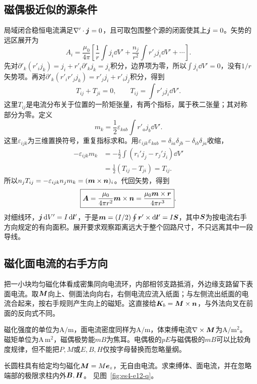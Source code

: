 \subsection{磁偶极近似的源条件}
局域闭合稳恒电流满足$\nabla'\cdot\bm{j}=0$，且可取包围整个源的闭面使其上$\bm{j}=0$。矢势的远区展开为
\[A_i=\frac{\mu_0}{4\pi}\left[\frac1r\int j_i\dd V'
+\frac{n_j}{r^2}\int r'_jj_i\dd V'+\cdots\right].
\]
先对$\partial'_k(r'_ij_k)=j_i+r'_i\partial'_kj_k=j_i$积分，边界项为零，所以$\int j_i\dd V'=0$，没有$1/r$矢势项。再对$\partial'_k(r'_ir'_jj_k)=r'_jj_i+r'_ij_j$积分，得到
\[T_{ij}+T_{ji}=0,\qquad T_{ij}=\int r'_jj_i\dd V'.\]
这里$T_{ij}$是电流分布关于位置的一阶矩张量，有两个指标，属于秩二张量；其对称部分为零。定义
\[m_k=\frac12\varepsilon_{kab}\int r'_aj_b\dd V'.\]
这里$\varepsilon_{ijk}$为三维置换符号，重复指标求和。用$\varepsilon_{ijk}\varepsilon_{kab}=\delta_{ia}\delta_{jb}-\delta_{ib}\delta_{ja}$收缩，
\[\begin{aligned}
-\varepsilon_{ijk}m_k
&=-\frac12\int(r_i'j_j-r_j'j_i)\dd V'\\
&=\frac12(T_{ij}-T_{ji})=T_{ij}.
\end{aligned}\]
所以$n_jT_{ij}=-\varepsilon_{ijk}n_jm_k=(\bm{m}\times\bm{n})_i$。代回矢势，得到
\[\boxed{\bm{A}=\frac{\mu_0}{4\pi r^2}\bm{m}\times\bm{n}
=\frac{\mu_0\bm{m}\times\bm{r}}{4\pi r^3}}.\]
对细线环，$\bm{j}\mathop{}\!\mathrm d V'=I\mathop{}\!\mathrm d\bm{l}'$，于是$\bm{m}=(I/2)\oint\bm{r}'\times\mathop{}\!\mathrm d\bm{l}'=I\bm{S}$，其中$\bm{S}$为按电流右手方向规定的有向面积。展开要求观察距离远大于整个回路尺寸，不只远离其中一段导线。

\subsection{磁化面电流的右手方向}
把一小块均匀磁化体看成密集同向电流环，内部相邻支路抵消，外边缘支路留下表面电流。取$\bm{M}$向上、侧面法向向右，右侧电流应流入纸面；与左侧流出纸面的电流合起来，按右手规则产生向上的磁矩。这直接给$\bm{K}_b=\bm{M}\times\bm{n}$，与外法向叉在前面的反向式不同。

磁化强度的单位为$\mathrm{A/m}$，面电流密度同样为$\mathrm{A/m}$，体束缚电流$\nabla\times\bm{M}$为$\mathrm{A/m^2}$。磁矩单位为$\mathrm{A\,m^2}$，磁偶极势能$mB$为焦耳。电偶极的$pE$与磁偶极的$mB$可以比较角度规律，但不能把$P,M$或$E,B,H$仅按字母替换而忽略量纲。

\begin{example}[均匀磁化圆柱的面电流方向]\label{ex:es4-e12}
长圆柱具有给定均匀磁化$\bm{M}=M\bm{e}_z$，无自由电流。求束缚体、面电流，并在忽略端部的极限求柱内外$\bm{B},\bm{H}$。 见图~\ref{fig:es4-e12-q}。
\end{example}


